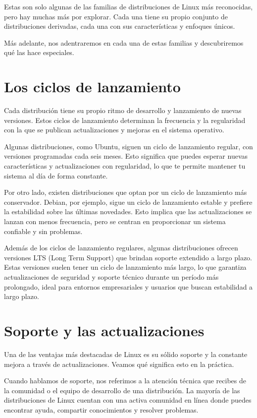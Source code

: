 \documentclass[
  jou,
  floatsintext,
  longtable,
  a4paper,
  nolmodern,
  notxfonts,
  notimes,
  colorlinks=true,linkcolor=blue,citecolor=blue,urlcolor=blue]{apa7}
\begin{document}
Estas son solo algunas de las familias de distribuciones de Linux más
reconocidas, pero hay muchas más por explorar. Cada una tiene su propio
conjunto de distribuciones derivadas, cada una con sus características y
enfoques únicos.

Más adelante, nos adentraremos en cada una de estas familias y
descubriremos qué las hace especiales.

\section{Los ciclos de lanzamiento}\label{los-ciclos-de-lanzamiento}

Cada distribución tiene su propio ritmo de desarrollo y lanzamiento de
nuevas versiones. Estos ciclos de lanzamiento determinan la frecuencia y
la regularidad con la que se publican actualizaciones y mejoras en el
sistema operativo.

Algunas distribuciones, como Ubuntu, siguen un ciclo de lanzamiento
regular, con versiones programadas cada seis meses. Esto significa que
puedes esperar nuevas características y actualizaciones con regularidad,
lo que te permite mantener tu sistema al día de forma constante.

Por otro lado, existen distribuciones que optan por un ciclo de
lanzamiento más conservador. Debian, por ejemplo, sigue un ciclo de
lanzamiento estable y prefiere la estabilidad sobre las últimas
novedades. Esto implica que las actualizaciones se lanzan con menos
frecuencia, pero se centran en proporcionar un sistema confiable y sin
problemas.

Además de los ciclos de lanzamiento regulares, algunas distribuciones
ofrecen versiones LTS (Long Term Support) que brindan soporte extendido
a largo plazo. Estas versiones suelen tener un ciclo de lanzamiento más
largo, lo que garantiza actualizaciones de seguridad y soporte técnico
durante un período más prolongado, ideal para entornos empresariales y
usuarios que buscan estabilidad a largo plazo.

\section{Soporte y las
actualizaciones}\label{soporte-y-las-actualizaciones}

Una de las ventajas más destacadas de Linux es su sólido soporte y la
constante mejora a través de actualizaciones. Veamos qué significa esto
en la práctica.

Cuando hablamos de soporte, nos referimos a la atención técnica que
recibes de la comunidad o el equipo de desarrollo de una distribución.
La mayoría de las distribuciones de Linux cuentan con una activa
comunidad en línea donde puedes encontrar ayuda, compartir conocimientos
y resolver problemas.
\end{document}

